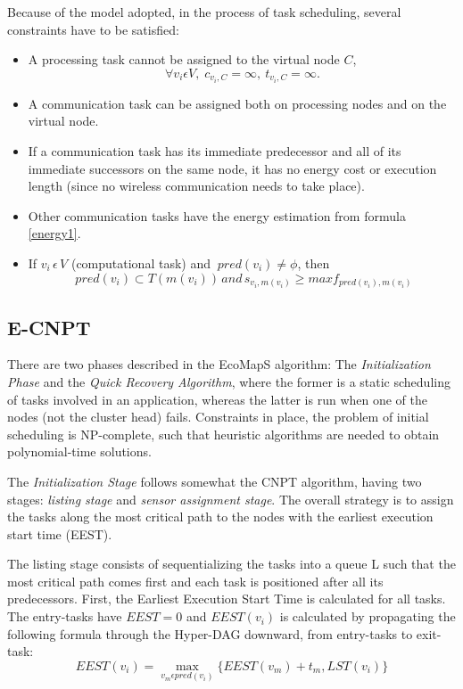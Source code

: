 Because of the model adopted, in the process of task scheduling, several constraints have to be satisfied:
\begin{itemize}
\item A processing task cannot be assigned to the virtual node $C$,
{\large \[ \forall v_i \epsilon V, \; c_{v_i,C} = \infty, \: t_{v_i,C}=\infty. \]}
\item A communication task can be assigned both on processing nodes and on the virtual node.
\item If a communication task has its immediate predecessor and all of its immediate successors on the same node, it has no energy
cost or execution length (since no wireless communication needs to take place).
\item Other communication tasks have the energy estimation from formula \eqref{energy1}. 
\item If $v_i \, \epsilon \, V$ (computational task) and $\:pred(v_i) \neq \phi$, then 
\[ \:pred(v_i) \subset T(m(v_i))\,and\, s_{v_i,m(v_i)} \geq max f_{pred(v_i),m(v_i)} \]
\end{itemize}

\subsection{E-CNPT}
There are two phases described in the EcoMapS algorithm: The \textit{Initialization Phase} and the \textit{Quick Recovery Algorithm}, where
the former is a static scheduling of tasks involved in an application, whereas the latter is run when one of the nodes (not the cluster
head) fails. Constraints in place, the problem of initial scheduling is NP-complete, such that heuristic algorithms are needed to obtain
polynomial-time solutions. 


The \textit{Initialization Stage} follows somewhat the CNPT algorithm\cite{Hagr2005}, having two stages: \textit{listing stage} and 
\textit{sensor assignment stage}. The overall strategy is to assign the tasks along the most critical path to the nodes with the 
earliest execution start time (EEST).

The listing stage consists of sequentializing the tasks into a queue L such that the most critical
path comes first and each task is positioned after all its predecessors. First, the Earliest Execution Start Time is calculated for all
tasks. The entry-tasks have $EEST = 0$ and $EEST(v_i)$ is calculated by propagating the following formula through the Hyper-DAG downward,
from entry-tasks to exit-task:
\[ EEST(v_i) = \max_{v_m \epsilon pred(v_i)} \{EEST(v_m) + t_m, LST(v_i)\} \]

